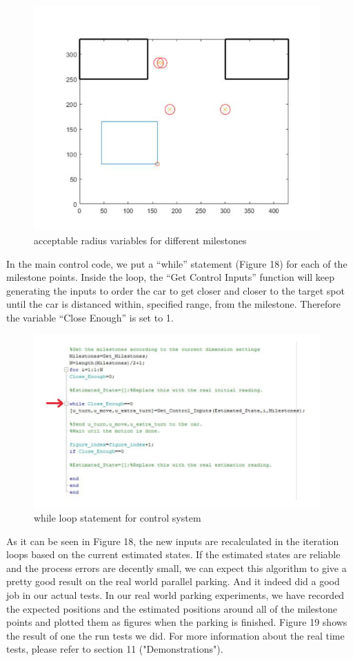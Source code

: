 \documentclass[12pt, letterpaper]{amsart} %
\numberwithin{equation}{section}
\begin{document}
\begin{figure}[h!]
\includegraphics[width=110mm]{./img/fig_17.png}
\caption{acceptable radius variables for different milestones}
\label{fig:figure17}	
\end{figure}
\newpage
In the main control code, we put a “while” statement (Figure 18) for each of the milestone points. Inside the loop, 
the “Get Control Inputs” function will keep generating 
the inputs to order the car to get closer and closer to 
the target spot until the car is distanced within,
specified range, from the milestone. Therefore the
variable “Close Enough” is set to 1.

\begin{figure}[h!]
\includegraphics[width=110mm]{./img/fig_18.png}
\caption{while loop statement for control system}
\label{fig:figure18}	
\end{figure}


As it can be seen in Figure 18, the new inputs are 
recalculated in the iteration loops based on the 
current estimated states. 
If the estimated states are reliable and the process 
errors are decently small, we can expect this 
algorithm to give a pretty good result on the real 
world parallel parking. And it indeed did a good job in 
our actual tests.
In our real world parking experiments, we have recorded 
the expected positions and the estimated positions 
around all of the milestone points and plotted them as 
figures when the parking is finished. Figure 19 shows 
the result of one the run tests we did. For more information about the real time tests, please refer to section 11 ("Demonstrations").
\end{document}
